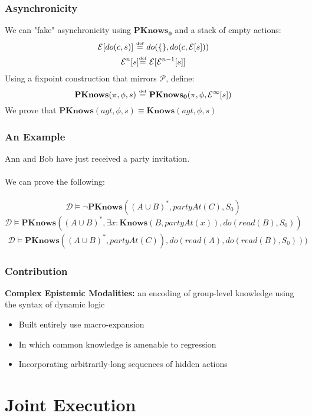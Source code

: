 \documentclass{beamer}
\newcommand{\isdef}{\hbox{$\stackrel{\mbox{\tiny def}}{=}$}}
\newcommand{\Dt}{\mathcal{D}}
\newcommand{\Pst}{\mathcal{P}}
\newcommand{\Knows}{\mathbf{Knows}}
\newcommand{\PKnows}{\mathbf{PKnows}}
\begin{document}
\begin{frame}
\frametitle{Asynchronicity}
We can "fake" asynchronicity using $\mathbf{PKnows_0}$ and a stack of empty actions:
\begin{gather*}
\mathcal{E}[do(c,s)]\ \isdef\ do(\{\},do(c,\mathcal{E}[s])) \\
\mathcal{E}^n[s] \isdef\ \mathcal{E}[\mathcal{E}^{n-1}[s]]
\end{gather*}
Using a fixpoint construction that mirrors $\Pst$, define:
\begin{equation*}
\mathbf{PKnows}(\pi,\phi,s)\ \isdef\ \mathbf{PKnows_0}(\pi,\phi,\mathcal{E}^{\infty}[s])
\end{equation*}
We prove that $\mathbf{PKnows}(agt,\phi,s) \equiv \mathbf{Knows}(agt,\phi,s)$
\end{frame}

\begin{frame}
\frametitle{An Example}
Ann and Bob have just received a party invitation.
\ \\
\ \\
We can prove the following:
\ \\
\ \\
\pause
\begin{equation*}
\Dt \models \neg\PKnows((A \cup B)^{*},partyAt(C),S_0)
\end{equation*}
\pause
\begin{equation*}
\Dt \models \PKnows((A \cup B)^{*},\exists x: \Knows(B,partyAt(x)),do(read(B),S_0))
\end{equation*}
\pause
\begin{multline*}
\Dt \models \PKnows((A \cup B)^{*},partyAt(C)),do(read(A),do(read(B),S_0)))
\end{multline*}
\end{frame}

\begin{frame}
\frametitle{Contribution}
\textbf{Complex Epistemic Modalities:}  an encoding of group-level knowledge using the syntax of dynamic logic
\begin{itemize}
\item Built entirely use macro-expansion
\item In which common knowledge is amenable to regression
\item Incorporating arbitrarily-long sequences of hidden actions
\end{itemize}
\end{frame}

\section{Joint Execution}
\end{document}
